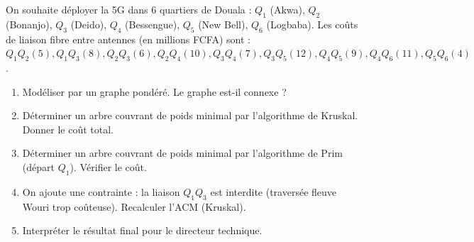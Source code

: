 \documentclass[11pt]{article}
\begin{document}
\begin{exercice}
On souhaite déployer la 5G dans 6 quartiers de Douala : $Q_1$ (Akwa), $Q_2$ (Bonanjo), $Q_3$ (Deido), $Q_4$ (Bessengue), $Q_5$ (New Bell), $Q_6$ (Logbaba).
Les coûts de liaison fibre entre antennes (en millions FCFA) sont :
$Q_1Q_2(5), Q_1Q_3(8), Q_2Q_3(6), Q_2Q_4(10), Q_3Q_4(7), Q_3Q_5(12), Q_4Q_5(9), Q_4Q_6(11), Q_5Q_6(4)$.
\begin{enumerate}
  \item Modéliser par un graphe pondéré. Le graphe est-il connexe ?
  \item Déterminer un arbre couvrant de poids minimal par l'algorithme de Kruskal. Donner le coût total.
  \item Déterminer un arbre couvrant de poids minimal par l'algorithme de Prim (départ $Q_1$). Vérifier le coût.
  \item On ajoute une contrainte : la liaison $Q_1Q_3$ est interdite (traversée fleuve Wouri trop coûteuse). Recalculer l'ACM (Kruskal).
  \item Interpréter le résultat final pour le directeur technique.
\end{enumerate}
\end{exercice}
\end{document}
